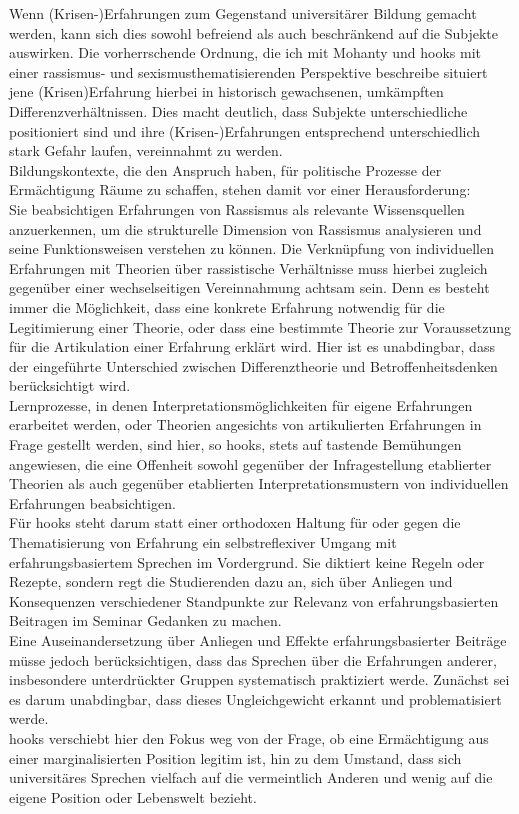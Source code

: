 \noindent Wenn (Krisen-)Erfahrungen zum Gegenstand universitärer Bildung gemacht werden,
kann sich dies sowohl befreiend als auch beschränkend auf die Subjekte
auswirken. Die vorherrschende Ordnung, die ich mit Mohanty und hooks mit einer
rassismus- und sexismusthematisierenden Perspektive beschreibe situiert jene
(Krisen)Erfahrung hierbei in historisch gewachsenen, umkämpften
Differenzverhältnissen. Dies macht deutlich, dass Subjekte unterschiedliche
positioniert sind und ihre (Krisen-)Erfahrungen entsprechend unterschiedlich
stark Gefahr laufen, vereinnahmt zu werden. \\
Bildungskontexte, die den Anspruch
haben, für politische Prozesse der Ermächtigung Räume zu schaffen, stehen damit
vor einer Herausforderung:\\
Sie beabsichtigen Erfahrungen von Rassismus als
relevante Wissensquellen anzuerkennen, um die strukturelle Dimension von
Rassismus analysieren und seine Funktionsweisen verstehen zu können. Die
Verknüpfung von individuellen Erfahrungen mit Theorien über rassistische
Verhältnisse muss hierbei zugleich gegenüber einer wechselseitigen
Vereinnahmung achtsam sein. Denn es besteht immer die Möglichkeit, dass eine
konkrete Erfahrung notwendig für die Legitimierung einer Theorie, oder dass
eine bestimmte Theorie zur Voraussetzung für die Artikulation einer Erfahrung
erklärt wird. Hier ist es unabdingbar, dass der eingeführte Unterschied
zwischen Differenztheorie und Betroffenheitsdenken berücksichtigt wird.\\
Lernprozesse, in denen Interpretationsmöglichkeiten für eigene Erfahrungen
erarbeitet werden, oder Theorien angesichts von artikulierten Erfahrungen in
Frage gestellt werden, sind hier, so hooks,  stets auf tastende Bemühungen
angewiesen, die eine Offenheit sowohl gegenüber der Infragestellung etablierter
Theorien als auch gegenüber etablierten Interpretationsmustern von
individuellen Erfahrungen beabsichtigen.\footnotemark{}\\

Für hooks steht darum statt einer orthodoxen Haltung für oder gegen die
Thematisierung von Erfahrung ein selbstreflexiver Umgang mit
erfahrungsbasiertem Sprechen im Vordergrund. Sie diktiert keine Regeln oder
Rezepte, sondern regt die Studierenden dazu an, sich über Anliegen und
Konsequenzen verschiedener Standpunkte zur Relevanz von erfahrungsbasierten
Beitragen im Seminar Gedanken zu machen.\\
Eine Auseinandersetzung über Anliegen
und Effekte erfahrungsbasierter Beiträge müsse jedoch berücksichtigen, dass das
Sprechen über die Erfahrungen anderer, insbesondere unterdrückter Gruppen
systematisch praktiziert werde. Zunächst sei es darum unabdingbar, dass dieses
Ungleichgewicht erkannt und problematisiert werde.\footnotemark{}\\
 hooks verschiebt hier den
Fokus weg von der Frage, ob eine Ermächtigung aus einer marginalisierten
Position legitim ist, hin zu dem Umstand, dass sich universitäres Sprechen
vielfach auf die vermeintlich Anderen und wenig auf die eigene Position oder
Lebenswelt bezieht. 

